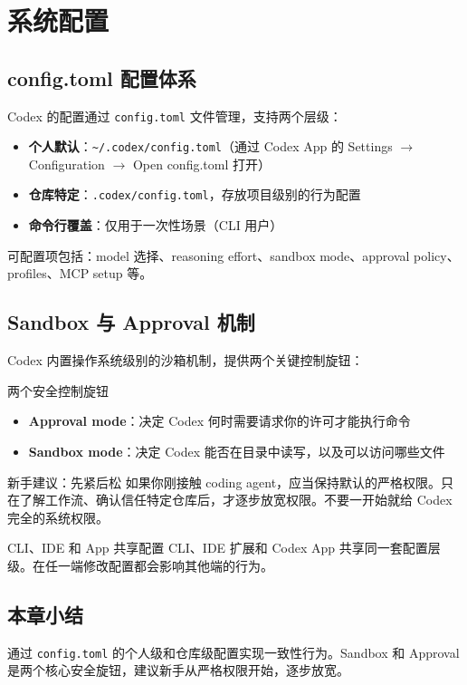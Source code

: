 \section{系统配置}

\subsection{config.toml 配置体系}

Codex 的配置通过 \texttt{config.toml} 文件管理，支持两个层级：

\begin{itemize}
    \item \textbf{个人默认}：\texttt{\textasciitilde/.codex/config.toml}（通过 Codex App 的 Settings $\rightarrow$ Configuration $\rightarrow$ Open config.toml 打开）
    \item \textbf{仓库特定}：\texttt{.codex/config.toml}，存放项目级别的行为配置
    \item \textbf{命令行覆盖}：仅用于一次性场景（CLI 用户）
\end{itemize}

可配置项包括：model 选择、reasoning effort、sandbox mode、approval policy、profiles、MCP setup 等。

\subsection{Sandbox 与 Approval 机制}

Codex 内置操作系统级别的沙箱机制，提供两个关键控制旋钮：

\begin{importantbox}{两个安全控制旋钮}
\begin{itemize}[nosep]
    \item \textbf{Approval mode}：决定 Codex 何时需要请求你的许可才能执行命令
    \item \textbf{Sandbox mode}：决定 Codex 能否在目录中读写，以及可以访问哪些文件
\end{itemize}
\end{importantbox}

\begin{warningbox}{新手建议：先紧后松}
如果你刚接触 coding agent，应当保持默认的严格权限。只在了解工作流、确认信任特定仓库后，才逐步放宽权限。不要一开始就给 Codex 完全的系统权限。
\end{warningbox}

\begin{knowledgebox}{CLI、IDE 和 App 共享配置}
CLI、IDE 扩展和 Codex App 共享同一套配置层级。在任一端修改配置都会影响其他端的行为。
\end{knowledgebox}

\subsection{本章小结}

通过 \texttt{config.toml} 的个人级和仓库级配置实现一致性行为。Sandbox 和 Approval 是两个核心安全旋钮，建议新手从严格权限开始，逐步放宽。

